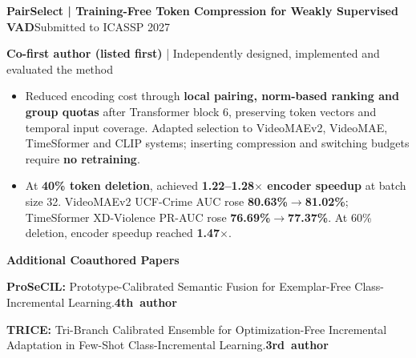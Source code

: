 \documentclass[11pt,a4paper]{article}
\newcommand{\entry}[2]{\par\noindent\textbf{#1}\hfill #2\par}
\newcommand{\researchmeta}[1]{{\fontsize{9.8}{12}\selectfont #1\par}\vspace{1pt}}
\begin{document}
\vspace{3pt}
\entry{PairSelect | Training-Free Token Compression for Weakly Supervised VAD}{Submitted to ICASSP 2027}
\researchmeta{\textbf{Co-first author (listed first)} | Independently designed, implemented and evaluated the method}
\begin{itemize}
\item Reduced encoding cost through \textbf{local pairing, norm-based ranking and group quotas} after Transformer block 6, preserving token vectors and temporal input coverage. Adapted selection to VideoMAEv2, VideoMAE, TimeSformer and CLIP systems; inserting compression and switching budgets require \textbf{no retraining}.
\item At \textbf{40\% token deletion}, achieved \textbf{1.22--1.28$\times$ encoder speedup} at batch size 32. VideoMAEv2 UCF-Crime AUC rose \textbf{80.63\%$\rightarrow$81.02\%}; TimeSformer XD-Violence PR-AUC rose \textbf{76.69\%$\rightarrow$77.37\%}. At 60\% deletion, encoder speedup reached \textbf{1.47$\times$}.
\end{itemize}

\vspace{2pt}
\textbf{Additional Coauthored Papers}\par\vspace{2pt}
{\fontsize{9.4}{11.5}\selectfont
\textbf{ProSeCIL:} Prototype-Calibrated Semantic Fusion for Exemplar-Free Class-Incremental Learning.\hfill \mbox{\textbf{4th author}}\par\vspace{2pt}
\textbf{TRICE:} Tri-Branch Calibrated Ensemble for Optimization-Free Incremental Adaptation in Few-Shot Class-Incremental Learning.\hfill \mbox{\textbf{3rd author}}\par
}
\end{document}
